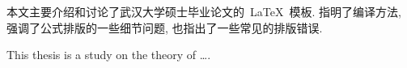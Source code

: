 

\begin{cnabstract}
本文主要介绍和讨论了武汉大学硕士毕业论文的~\LaTeX~模板.
指明了编译方法, 强调了公式排版的一些细节问题, 也指出了一些常见的排版错误.



\end{cnabstract}
\vspace{1em}\par\vfill





\begin{enabstract}
This thesis is a study on the theory of \dots.




\end{enabstract}
\vspace{1em}\par\vfill



